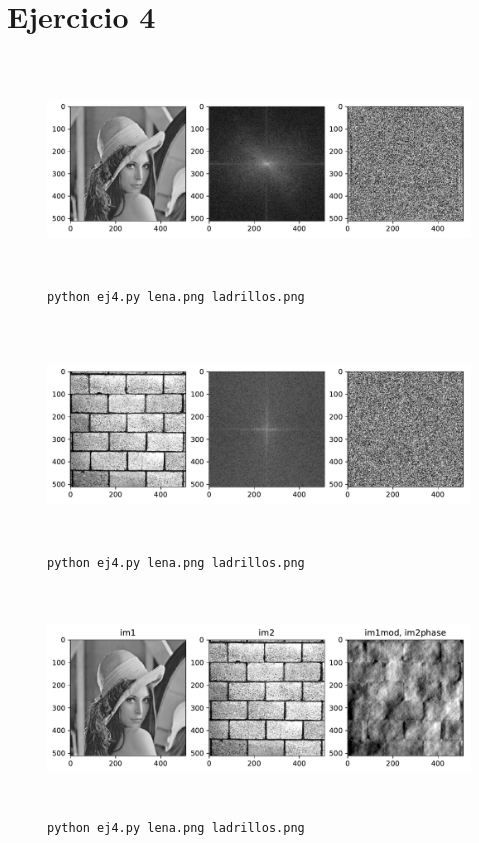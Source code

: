 \documentclass[11pt, spanish]{article}
\begin{document}
\newpage
\section{Ejercicio 4}

\begin{figure}[H]
\centering
  \includegraphics[height=6cm]{informe-imgs/ej4-lena.pdf}
  \caption{\texttt{python ej4.py lena.png ladrillos.png}}
\end{figure}

\begin{figure}[H]
\centering
  \includegraphics[height=6cm]{informe-imgs/ej4-ladrillos.pdf}
  \caption{\texttt{python ej4.py lena.png ladrillos.png}}
\end{figure}

\begin{figure}[H]
\centering
  \includegraphics[height=6cm]{informe-imgs/ej4-a.pdf}
  \caption{\texttt{python ej4.py lena.png ladrillos.png}}
\end{figure}
\end{document}
